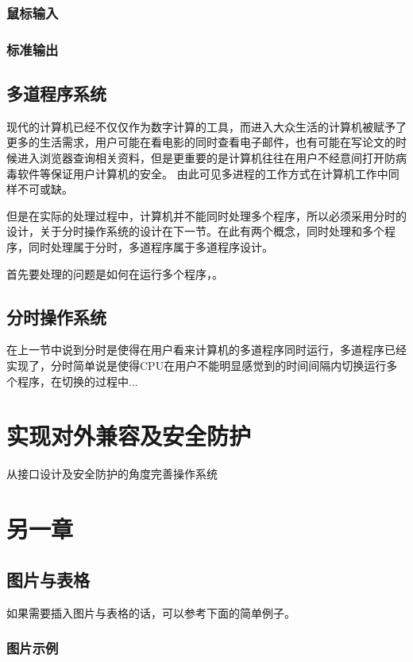\documentclass{swfcthesis}
\begin{document}
		\subsection{鼠标输入}
		\subsection{标准输出}
		
                
	\section{多道程序系统}
		现代的计算机已经不仅仅作为数字计算的工具，而进入大众生活的计算机被赋予了更多的生活需求，用户可能在看电影的同时查看电子邮件，也有可能在写论文的时候进入浏览器查询相关资料，但是更重要的是计算机往往在用户不经意间打开防病毒软件等保证用户计算机的安全\cite{tanenbaum2009modern}。
		由此可见多进程的工作方式在计算机工作中同样不可或缺。

		但是在实际的处理过程中，计算机并不能同时处理多个程序，所以必须采用分时的设计，关于分时操作系统的设计在下一节。在此有两个概念，同时处理和多个程序，同时处理属于分时，多道程序属于多道程序设计。

		首先要处理的问题是如何在运行多个程序，。
	\section{分时操作系统}
		在上一节中说到分时是使得在用户看来计算机的多道程序同时运行，多道程序已经实现了，分时简单说是使得CPU在用户不能明显感觉到的时间间隔内切换运行多个程序，在切换的过程中...
	
\chapter{实现对外兼容及安全防护}
从接口设计及安全防护的角度完善操作系统


\chapter{另一章}

\section{图片与表格}

如果需要插入图片与表格的话，可以参考下面的简单例子。

\subsection{图片示例}
\end{document}
